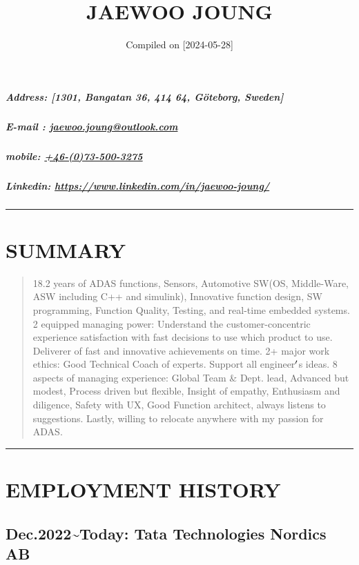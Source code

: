 \documentclass[12pt,a4paper]{article}
\title{ JAEWOO JOUNG }
\date{ Compiled on [2024-05-28] }
\begin{document}
\maketitle

\subparagraph{Address: [1301, Bangatan 36, 414 64, Göteborg, Sweden]}
\subparagraph{E-mail : \href{mailto:jaewoo.joung@outlook.com}{jaewoo.joung@outlook.com}}
\subparagraph{mobile:  \href{tel:+46-(0)73-500-3275}{+46-(0)73-500-3275}}
\subparagraph{Linkedin: \href{https://www.linkedin.com/in/jaewoo-joung/}{https://www.linkedin.com/in/jaewoo-joung/}}
\begin{quote}
\end{quote}
\rule{\textwidth}{1pt}
\section{SUMMARY}
\begin{quote}
18.2 years of ADAS functions, Sensors, Automotive SW(OS, Middle-Ware, ASW including C++ and simulink), Innovative function design, SW programming, Function Quality, Testing, and real-time embedded systems. 2 equipped managing power: Understand the customer-concentric experience satisfaction with fast decisions to use which product to use. Deliverer of fast and innovative achievements on time. 2+ major work ethics: Good Technical Coach of experts. Support all engineer\ensuremath{\rq}s ideas. 8 aspects of managing experience: Global Team \& Dept. lead, Advanced but modest, Process driven but flexible, Insight of empathy, Enthusiasm and diligence, Safety with UX, Good Function architect, always listens to suggestions. Lastly, willing to relocate anywhere with my passion for ADAS.

\end{quote}
\rule{\textwidth}{1pt}
\section{EMPLOYMENT HISTORY}
\subsection{Dec.2022{\textasciitilde}Today: Tata Technologies Nordics AB}
\end{document}
